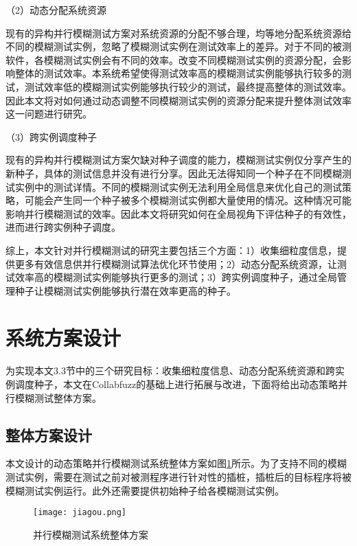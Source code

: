 \documentclass[master]{thesis-uestc}
\begin{document}
（2）动态分配系统资源

现有的异构并行模糊测试方案对系统资源的分配不够合理，均等地分配系统资源给不同的模糊测试实例，忽略了模糊测试实例在测试效率上的差异。对于不同的被测软件，各模糊测试实例会有不同的效率。改变不同模糊测试实例的资源分配，会影响整体的测试效率。本系统希望使得测试效率高的模糊测试实例能够执行较多的测试，测试效率低的模糊测试实例能够执行较少的测试，最终提高整体的测试效率。因此本文将对如何通过动态调整不同模糊测试实例的资源分配来提升整体测试效率这一问题进行研究。

（3）跨实例调度种子

现有的异构并行模糊测试方案欠缺对种子调度的能力，模糊测试实例仅分享产生的新种子，具体的测试信息并没有进行分享。因此无法得知同一个种子在不同模糊测试实例中的测试详情。不同的模糊测试实例无法利用全局信息来优化自己的测试策略，可能会产生同一个种子被多个模糊测试实例都大量使用的情况。这种情况可能影响并行模糊测试的效率。因此本文将研究如何在全局视角下评估种子的有效性，进而进行跨实例种子调度。

综上，本文针对并行模糊测试的研究主要包括三个方面：1）收集细粒度信息，提供更多有效信息供并行模糊测试算法优化环节使用；2）动态分配系统资源，让测试效率高的模糊测试实例能够执行更多的测试；3）跨实例调度种子，通过全局管理种子让模糊测试实例能够执行潜在效率更高的种子。

\section{系统方案设计}
为实现本文3.3节中的三个研究目标：收集细粒度信息、动态分配系统资源和跨实例调度种子，本文在Collabfuzz的基础上进行拓展与改进，下面将给出动态策略并行模糊测试整体方案。

\subsection{整体方案设计}
本文设计的动态策略并行模糊测试系统整体方案如图\ref{jiagou}所示。为了支持不同的模糊测试实例，需要在测试之前对被测程序进行针对性的插桩，插桩后的目标程序将被模糊测试实例运行。此外还需要提供初始种子给各模糊测试实例。
\begin{figure}[!htbp]
    \vspace{6pt}
    \centering
    \texttt{[image: jiagou.png]}
    \caption{并行模糊测试系统整体方案}
    \label{jiagou}
\end{figure}
\end{document}
